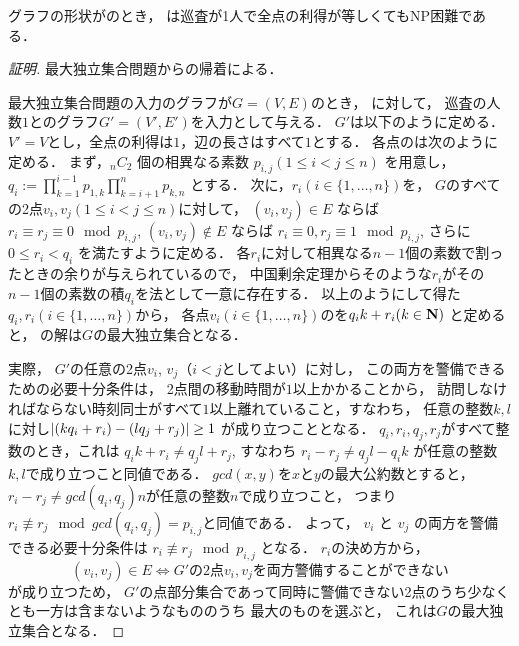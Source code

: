 \begin{theo}
  \label{theo:unit_exacidletime_NPhard}
  グラフの形状が{\graphUnit}のとき，
  {\timeSpecifiedPatProb}は巡査が1人で全点の利得が等しくてもNP困難である．
\end{theo}


\begin{proof}[証明]
  最大独立集合問題からの帰着による．

  最大独立集合問題の入力のグラフが$G = (V, E)$のとき，
  {\timeSpecifiedPatProb}に対して，
  巡査の人数$1$と{\graphUnit}のグラフ$G' = (V', E')$を入力として与える．
  $G'$は以下のように定める．
  $V' = V$とし，全点の利得は$1$，辺の長さはすべて$1$とする．
  各点の{\exactidletime}は次のように定める．
  まず，${}_n C_2$ 個の相異なる素数 $p_{i,j} (1 \leq i < j \leq n)$ を用意し，
  $q_i := \prod_{k = 1}^{i - 1} p_{1,k} \prod_{k = i + 1}^n p_{k,n}$
  とする．
  次に，$r_i (i \in \{1, \ldots, n\})$を，
  $G$のすべての2点$v_i, v_j (1 \leq i < j \leq n)$に対して，
  $(v_i, v_j) \in E$     ならば $r_i \equiv    r_j \equiv 0 \mod p_{i,j}$,
  $(v_i, v_j) \not\in E$ ならば $r_i \equiv 0, r_j \equiv 1 \mod p_{i,j}$,
  さらに$0 \leq r_i < q_i$
  を満たすように定める．
  各$r_i$に対して相異なる$n - 1$個の素数で割ったときの余りが与えられているので，
  中国剰余定理からそのような$r_i$がその$n - 1$個の素数の積$q_i$を法として一意に存在する．
  以上のようにして得た$q_i, r_i (i \in \{ 1, \ldots, n\})$から，
  各点$v_i (i \in \{1, \ldots, n\})$の{\exactidletime}を$q_i k + r_i (k \in \mathbf N)$
  と定めると，
  {\timeSpecifiedPatProb}の解は$G$の最大独立集合となる．

  実際，
  $G'$の任意の2点$v_i$, $v_j$（$i < j$としてよい）に対し，
  この両方を警備できるための必要十分条件は，
  2点間の移動時間が$1$以上かかることから，
  訪問しなければならない時刻同士がすべて$1$以上離れていること，すなわち，
  任意の整数$k, l$に対し$\lvert{(k q_i + r_i) - (l q_j + r_j)}\rvert \geq 1$
  が成り立つこととなる．
  $q_i, r_i, q_j, r_j$がすべて整数のとき，これは
  $q_i k + r_i \neq q_j l + r_j$, 
  すなわち
  $r_i - r_j \neq q_j l - q_i k$
  が任意の整数$k, l$で成り立つこと同値である．
  $gcd(x,y)$を$x$と$y$の最大公約数とすると，
  $r_i - r_j \neq gcd(q_i,q_j) n$が任意の整数$n$で成り立つこと，
  つまり$r_i \not\equiv r_j \mod gcd(q_i, q_j) = p_{i,j}$と同値である．
  よって，
  $v_i$ と $v_j$ の両方を警備できる必要十分条件は
  $r_i \not\equiv r_j \mod p_{i, j}$
  となる．
  $r_i$の決め方から，
  \[
    (v_i, v_j) \in E \iff \text{$G'$の2点$v_i, v_j$を両方警備することができない}
  \]
  が成り立つため，
  $G'$の点部分集合であって同時に警備できない2点のうち少なくとも一方は含まないようなもののうち
  最大のものを選ぶと，
  これは$G$の最大独立集合となる．


\end{proof}
